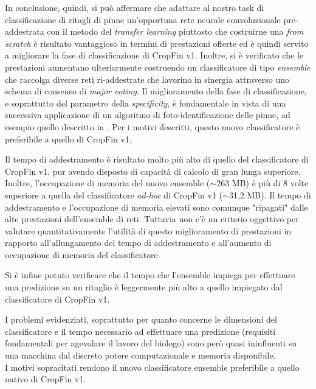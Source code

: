 In conclusione, quindi, si può affermare che adattare al nostro task di classificazione di ritagli di pinne un'opportuna rete neurale convoluzionale pre-addestrata con il metodo del \textit{transfer learning} piuttosto che costruirne una \textit{from scratch} è risultato vantaggioso in termini di prestazioni offerte ed è quindi servito a migliorare la fase di classificazione di CropFin v1. Inoltre, si è verificato che le prestazioni aumentano ulteriormente costruendo un classificatore di tipo \textit{ensemble} che raccolga diverse reti ri-addestrate che lavorino in sinergia attraverso uno schema di consenso di \textit{major voting}.
Il miglioramento della fase di classificazione, e soprattutto del parametro della \textit{specificity}, è fondamentale in vista di una successiva applicazione di un algoritmo di foto-identificazione delle pinne, ad esempio quello descritto in \cite{emanuele}.
Per i motivi descritti, questo nuovo classificatore è preferibile a quello di CropFin v1.

Il tempo di addestramento è risultato molto più alto di quello del classificatore di CropFin v1, pur avendo disposto di capacità di calcolo di gran lunga superiore.
Inoltre, l'occupazione di memoria del nuovo ensemble ($\sim$263 MB) è più di 8 volte superiore a quella del classificatore \textit{ad-hoc} di CropFin v1 ($\sim$31,2 MB).
Il tempo di addestramento e l'occupazione di memoria elevati sono comunque "ripagati" dalle alte prestazioni dell'ensemble di reti.
Tuttavia non c'è un criterio oggettivo per valutare quantitativamente l'utilità di questo miglioramento di prestazioni in rapporto all'allungamento del tempo di addestramento e all'aumento di occupazione di memoria del classificatore.

Si è infine potuto verificare che il tempo che l'ensemble impiega per effettuare una predizione su un ritaglio è leggermente più alto a quello impiegato dal classificatore di CropFin v1.

I problemi evidenziati, soprattutto per quanto concerne le dimensioni del classificatore e il tempo necessario ad effettuare una predizione (requisiti fondamentali per agevolare il lavoro del biologo) sono però quasi ininfluenti su una macchina dal discreto potere computazionale e memoria disponibile.\\

\noindent I motivi sopracitati rendono il nuovo classificatore ensemble preferibile a quello nativo di CropFin v1.